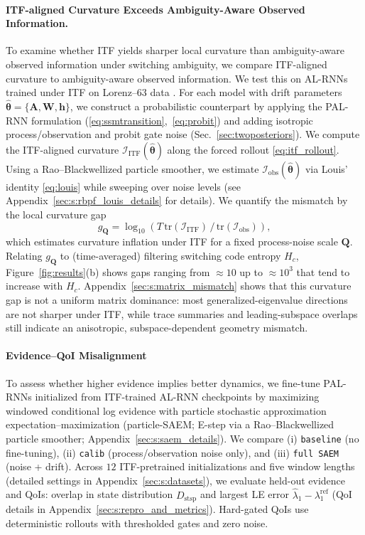 \documentclass[twoside]{article}
\theoremstyle{plain}
\theoremstyle{definition}
\theoremstyle{remark}
\newcommand{\Io}{\bm{\mathcal{I}}_{\mathrm{obs}}}
\begin{document}
\paragraph{ITF-aligned Curvature Exceeds Ambiguity-Aware Observed Information.}
To examine whether ITF yields sharper local curvature than ambiguity-aware observed information under switching ambiguity, we compare ITF-aligned curvature to ambiguity-aware observed information. We test this on AL-RNNs trained under ITF on Lorenz--63 data \citep{lorenz1963deterministic}. For each model with drift parameters $\hat{\bm\theta}=\{\bm A,\bm W,\bm h\}$, we construct a probabilistic counterpart by applying the PAL-RNN formulation (\ref{eq:ssmtransition},~\ref{eq:probit}) and adding isotropic process/observation and probit gate noise (Sec.~\ref{sec:twoposteriors}). We compute the ITF-aligned curvature $\bm{\mathcal I}_{\mathrm{ITF}}(\hat{\bm\theta})$ along the forced rollout \eqref{eq:itf_rollout}. Using a Rao--Blackwellized particle smoother, we estimate $\Io(\hat{\bm\theta})$ via Louis' identity \eqref{eq:louis} while sweeping over noise levels (see Appendix~\ref{sec:s:rbpf_louis_details} for details). We quantify the mismatch by the local curvature gap
\begin{equation}
    \label{eq:gap}
    g_{\bm Q}=\log_{10}\!\left(T\,\mathrm{tr}(\bm{\mathcal I}_{\mathrm{ITF}})\,/\,\mathrm{tr}(\Io)\right),
\end{equation}
which estimates curvature inflation under ITF for a fixed process-noise scale $\bm Q$. Relating $g_{\bm Q}$ to (time-averaged) filtering switching code entropy $H_c$, Figure~\ref{fig:results}(b) shows gaps ranging from  $\approx 10$ up to $\approx 10^3$ that tend to increase with $H_c$. Appendix~\ref{sec:s:matrix_mismatch} shows that this curvature gap is not a uniform matrix dominance: most generalized-eigenvalue directions are not sharper under ITF, while trace summaries and leading-subspace overlaps still indicate an anisotropic, subspace-dependent geometry mismatch.

\paragraph{Evidence–QoI Misalignment}
To assess whether higher evidence implies better dynamics, we fine-tune PAL-RNNs initialized from ITF-trained AL-RNN checkpoints by maximizing windowed conditional log evidence with particle stochastic approximation expectation--maximization (particle-SAEM; E-step via a Rao--Blackwellized particle smoother; Appendix~\ref{sec:s:saem_details}). We compare (i) \texttt{baseline} (no fine-tuning), (ii) \texttt{calib} (process/observation noise only), and (iii) \texttt{full SAEM} (noise + drift). Across $12$ ITF-pretrained initializations and five window lengths
(detailed settings in Appendix~\ref{sec:s:datasets}), we evaluate held-out evidence and QoIs: overlap in state distribution $D_{\mathrm{stsp}}$ and largest LE error $\widehat{\lambda}_1-\lambda_1^{\mathrm{ref}}$ (QoI details in Appendix~\ref{sec:s:repro_and_metrics}). Hard-gated QoIs use deterministic rollouts with thresholded gates and zero noise.
\end{document}
